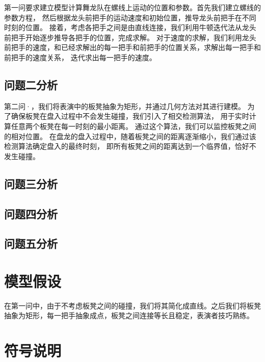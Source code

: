 \documentclass[withoutpreface,bwprint]{cumcmthesis} %
\begin{document}
第一问要求建立模型计算舞龙队在螺线上运动的位置和参数。首先我们建立螺线的参数方程，
然后根据龙头前把手的运动速度和初始位置，推导龙头前把手在不同时刻的位置。
接着，考虑各把手之间是由直线连接，我们利用牛顿迭代法从龙头前把手开始逐步推导各把手的位置，完成求解。
对于速度的求解，我们利用龙头前把手的速度，和已经求解出的每一把手和前把手的位置关系，求解出每一把手和前把手的速度关系，
迭代求出每一把手的速度。
\subsection{问题二分析}

第二问·，我们将表演中的板凳抽象为矩形，并通过几何方法对其进行建模。
为了确保板凳在盘入过程中不会发生碰撞，我们引入了相交检测算法，
用于实时计算任意两个板凳在每一时刻的最小距离。
通过这个算法，我们可以监控板凳之间的相对位置。
在盘龙的盘入过程中，随着板凳之间的距离逐渐缩小，我们通过该检测算法确定盘入的最终时刻，
即所有板凳之间的距离达到一个临界值，恰好不发生碰撞。
\subsection{问题三分析}


\subsection{问题四分析}


\subsection{问题五分析}



\section{模型假设}
在第一问中，由于不考虑板凳之间的碰撞，我们将其简化成直线。之后我们将板凳抽象为矩形，每一把手抽象成点，板凳之间连接等长且稳定，表演者技巧熟练。




\section{符号说明}
\end{document}
